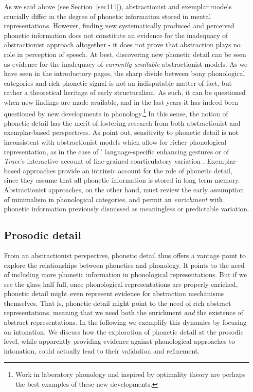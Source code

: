 As we said above (see Section~\ref{sec111}), abstractionist and exemplar models crucially differ in the degree of phonetic information stored in mental representations. However, finding new systematically produced and perceived phonetic information does not constitute an evidence for the inadequacy of abstractionist approach altogether - it does not prove that abstraction plays no role in perception of speech. At best, discovering new phonetic detail can be seen as evidence for the inadequacy of \textit{currently available} abstractionist models. As we have seen in the introductory pages, the sharp divide between bony phonological categories and rich phonetic signal is not an indisputable matter of fact, but rather a theoretical heritage of early structuralism. As such, it can be questioned when new findings are made available, and in the last years it has indeed been questioned by new developments in phonology.\footnote{Work in laboratory phonology \citep{ohala1990interface,pierrehumbert1990phonological,pierrehumbert2000conceptual} and inspired by optimality theory \citep{flemming1997phonetic,flemming2001scalar} are perhaps the best examples of these new developments.} In this sense, the notion of phonetic detail has the merit of fostering research from both abstractionist and exemplar-based perspectives. As \citet{nguyen2009dynamical} point out, sensitivity to phonetic detail is not inconsistent with abstractionist models which allow for richer phonological representation, as in the case of \citeauthor{stevens2004invariance}' \citeyearpar{stevens2004invariance} language-specific enhancing gestures or of \textit{Trace}'s interactive account of fine-grained coarticulatory variation \citep{elman1988cognitive}. Exemplar-based approaches provide an intrinsic account for the role of phonetic detail, since they assume that all phonetic information is stored in long term memory. Abstractionist approaches, on the other hand, must review the early assumption of minimalism in phonological categories, and permit an \textit{enrichment} with phonetic information previously dismissed as meaningless or predictable variation.

\subsection{Prosodic detail}\label{sec113}
From an abstractionist perspective, phonetic detail thus offers a vantage point to explore the relationships between phonetics and phonology. It points to the need of including more phonetic information in phonological representations. But if we see the glass half full, once phonological representations are properly enriched, phonetic detail might even represent evidence for abstraction mechanisms themselves. That is, phonetic detail might point to the need of rich abstract representations, meaning that we need both the enrichment \textit{and} the existence of abstract representations. In the following we exemplify this dynamics by focusing on intonation. We discuss how the exploration of phonetic detail at the prosodic level, while apparently providing evidence against phonological approaches to intonation, could actually lead to their validation and refinement.


